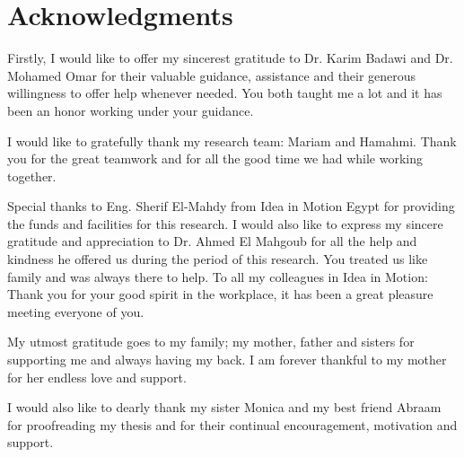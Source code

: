 \chapter*{Acknowledgments}
\label{chap:ack}

Firstly, I would like to offer my sincerest gratitude to Dr. Karim Badawi and Dr. Mohamed Omar for their valuable guidance, assistance and their generous willingness to offer help whenever needed. You both taught me a lot and it has been an honor working under your guidance. 

\bigskip

I would like to gratefully thank my research team: Mariam and Hamahmi. Thank you for the great teamwork and for all the good time we had while working together.

\bigskip

Special thanks to Eng. Sherif El-Mahdy from Idea in Motion Egypt for providing the funds and facilities for this research. 
I would also like to express my sincere gratitude and appreciation to Dr. Ahmed El Mahgoub for all the help and kindness he offered us during the period of this research. You treated us like family and was always there to help.
To all my colleagues in Idea in Motion: Thank you for your good spirit in the workplace, it has been a great pleasure meeting everyone of you.

\bigskip

My utmost gratitude goes to my family; my mother, father and sisters for supporting me and always having my back. I am forever thankful to my mother for her endless love and support. 

\bigskip

I would also like to dearly thank my sister Monica and my best friend Abraam for proofreading my thesis and for their continual encouragement, motivation and support.